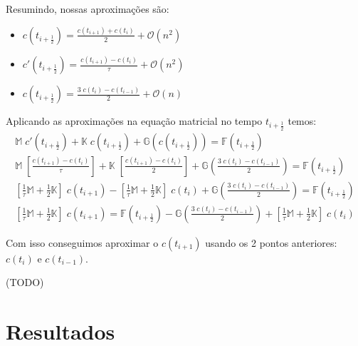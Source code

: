 \documentclass[a4paper]{article}
\begin{document}
Resumindo, nossas aproximações são:
\begin{itemize}
\item \(
    c(t_{i+\frac12})
    =
    \frac{c(t_{i+1}) + c(t_i)}{2}
    + \mathcal{O}(n^2)
\)
\item \(
    c'(t_{i+\frac12})
    =
    \frac{c(t_{i+1}) - c(t_i)}{\tau}
    + \mathcal{O}(n^2)
\)
\item \(
    c(t_{i+\frac12})
    =
    \frac{3 \; c(t_i) - c(t_{i-1})}{2}
    + \mathcal{O}(n)
\)
\end{itemize}

Aplicando as aproximações na equação matricial
no tempo \(t_{i+\frac12}\)
temos:
\[ \begin{array}{l} \displaystyle
    \mathbb{M} \; c'(t_{i+\frac12})
    + \mathbb{K} \; c(t_{i+\frac12})
    + \mathbb{G}(c(t_{i+\frac12}))
    = \mathbb{F}\left( t_{i+\frac12} \right)
    \\[3ex] \displaystyle
    \mathbb{M} \; \left[ \frac{c(t_{i+1}) - c(t_i)}{\tau} \right]
    + \mathbb{K} \; \left[ \frac{c(t_{i+1}) - c(t_i)}{2} \right]
    + \mathbb{G}\left( \frac{3 \; c(t_i) - c(t_{i-1})}{2} \right)
    = \mathbb{F}\left( t_{i+\frac12} \right)
    \\[3ex] \displaystyle
    \left[ \frac1\tau \mathbb{M} + \frac12 \mathbb{K} \right] \; c(t_{i+1})
    - \left[ \frac1\tau \mathbb{M} + \frac12 \mathbb{K} \right] \; c(t_i)
    + \mathbb{G}\left( \frac{3 \; c(t_i) - c(t_{i-1})}{2} \right)
    = \mathbb{F}\left( t_{i+\frac12} \right)
    \\[3ex] \displaystyle
    \left[ \frac1\tau \mathbb{M} + \frac12 \mathbb{K} \right] \; c(t_{i+1})
    = \mathbb{F}\left( t_{i+\frac12} \right)
    - \mathbb{G}\left( \frac{3 \; c(t_i) - c(t_{i-1})}{2} \right)
    + \left[ \frac1\tau \mathbb{M} + \frac12 \mathbb{K} \right] \; c(t_i)
\end{array} \]

Com isso conseguimos aproximar o
\(c(t_{i+1})\) usando os 2 pontos anteriores:
\(c(t_i)\) e \(c(t_{i-1})\).

(TODO)

\newpage
\section{Resultados}

\end{document}

